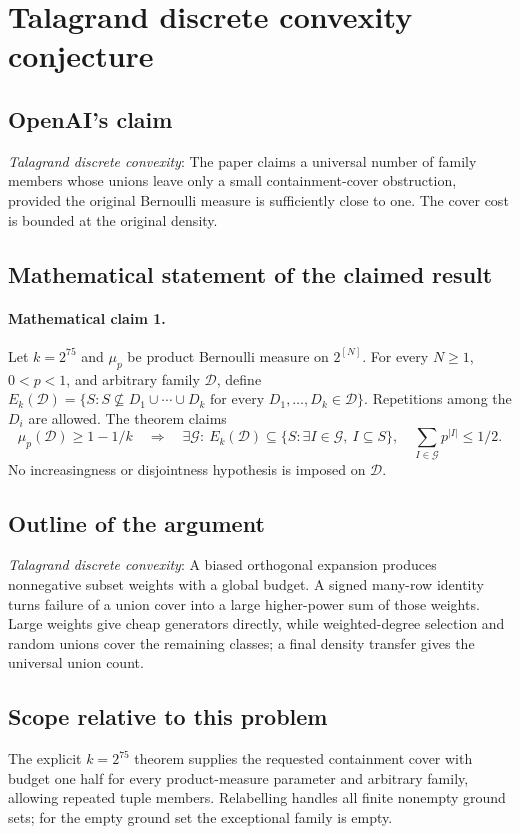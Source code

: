 \documentclass[11pt]{article}
\begin{document}
\section*{Talagrand discrete convexity conjecture}

\subsection{OpenAI's claim}
\textit{Talagrand discrete convexity}: The paper claims a universal number of family members whose unions leave only a small containment-cover obstruction, provided the original Bernoulli measure is sufficiently close to one. The cover cost is bounded at the original density.

\subsection{Mathematical statement of the claimed result}
\paragraph{Mathematical claim 1.} Let $k=2^{75}$ and $\mu_p$ be product Bernoulli measure on $2^{[N]}$. For every $N\ge1$, $0<p<1$, and arbitrary family $\mathcal D$, define $E_k(\mathcal D)=\{S:S\nsubseteq D_1\cup\cdots\cup D_k\text{ for every }D_1,\ldots,D_k\in\mathcal D\}$. Repetitions among the $D_i$ are allowed. The theorem claims \[\mu_p(\mathcal D)\ge1-1/k\quad\Longrightarrow\quad\exists\mathcal G:\ E_k(\mathcal D)\subseteq\{S:\exists I\in\mathcal G,\ I\subseteq S\},\quad\sum_{I\in\mathcal G}p^{|I|}\le1/2.\] No increasingness or disjointness hypothesis is imposed on $\mathcal D$.

\subsection{Outline of the argument}
\textit{Talagrand discrete convexity}: A biased orthogonal expansion produces nonnegative subset weights with a global budget. A signed many-row identity turns failure of a union cover into a large higher-power sum of those weights. Large weights give cheap generators directly, while weighted-degree selection and random unions cover the remaining classes; a final density transfer gives the universal union count.

\subsection{Scope relative to this problem}
The explicit $k=2^{75}$ theorem supplies the requested containment cover with budget one half for every product-measure parameter and arbitrary family, allowing repeated tuple members. Relabelling handles all finite nonempty ground sets; for the empty ground set the exceptional family is empty.
\end{document}
